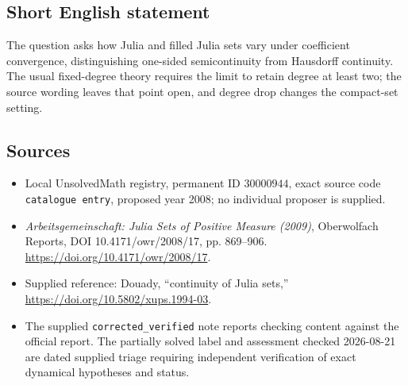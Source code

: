 \documentclass[11pt]{article}
\begin{document}
\subsection{Short English statement}
The question asks how Julia and filled Julia sets vary under coefficient convergence, distinguishing one-sided semicontinuity from Hausdorff continuity. The usual fixed-degree theory requires the limit to retain degree at least two; the source wording leaves that point open, and degree drop changes the compact-set setting.
\subsection{Sources}
\begin{itemize}
\item Local UnsolvedMath registry, permanent ID \(30000944\), exact source code \texttt{catalogue entry}, proposed year 2008; no individual proposer is supplied.
\item \emph{Arbeitsgemeinschaft: Julia Sets of Positive Measure (2009)}, Oberwolfach Reports, DOI 10.4171/owr/2008/17, pp. 869--906. \url{https://doi.org/10.4171/owr/2008/17}.
\item Supplied reference: Douady, ``continuity of Julia sets,'' \url{https://doi.org/10.5802/xups.1994-03}.
\item The supplied \texttt{corrected\_verified} note reports checking content against the official report. The partially solved label and assessment checked 2026-08-21 are dated supplied triage requiring independent verification of exact dynamical hypotheses and status.
\end{itemize}
\end{document}
